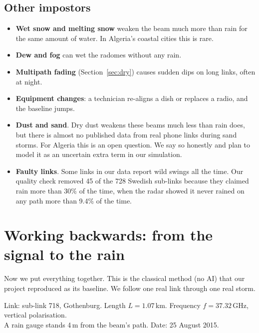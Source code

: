 \documentclass[11pt,a4paper]{article}
\begin{document}
\subsection{Other impostors}
\begin{itemize}
\item \textbf{Wet snow and melting snow} weaken the beam much more than rain for the same amount of water.
In Algeria's coastal cities this is rare.
\item \textbf{Dew and fog} can wet the radomes without any rain.
\item \textbf{Multipath fading} (Section~\ref{sec:dry}) causes sudden dips on long links, often at night.
\item \textbf{Equipment changes}: a technician re-aligns a dish or replaces a radio, and the baseline jumps.
\item \textbf{Dust and sand}. Dry dust weakens these beams much less than rain does, but there is almost no
published data from real phone links during sand storms. For Algeria this is an open question. We say so
honestly and plan to model it as an uncertain extra term in our simulation.
\item \textbf{Faulty links}. Some links in our data report wild swings all the time. Our quality check removed
45 of the 728 Swedish sub-links because they claimed rain more than 30\% of the time, when the radar showed it
never rained on any path more than 9.4\% of the time.
\end{itemize}

\section{Working backwards: from the signal to the rain}
\label{sec:inverse}

Now we put everything together. This is the classical method (no AI) that our project reproduced as
its baseline. We follow one real link through one real storm.

\begin{center}\small
Link: sub-link 718, Gothenburg. Length $L = 1.07$\,km. Frequency $f = 37.32$\,GHz, vertical polarisation.\\
A rain gauge stands 4\,m from the beam's path. Date: 25 August 2015.
\end{center}
\end{document}
